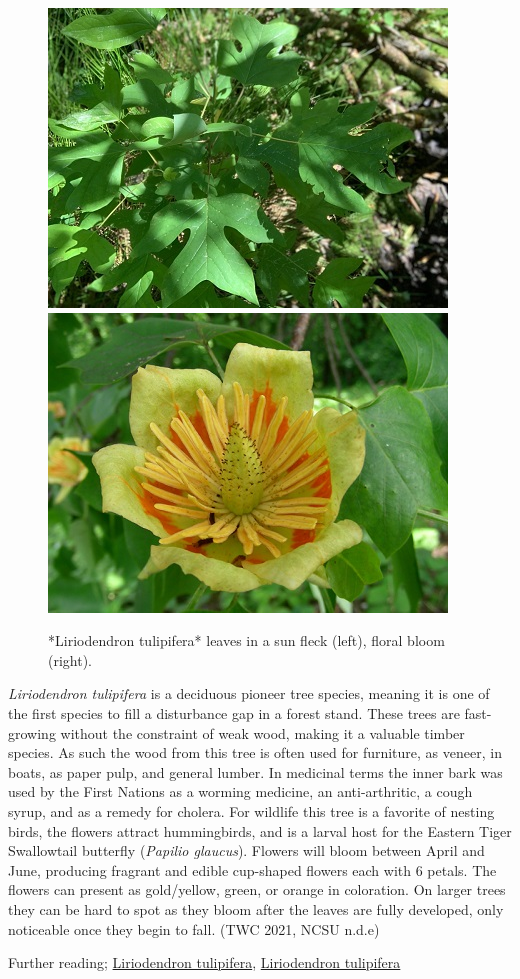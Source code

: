 \documentclass[
]{article}
\begin{document}
\begin{figure}

{\centering \includegraphics[width=0.5\linewidth]{tulip} \includegraphics[width=0.5\linewidth]{tulipflower} 

}

\caption{*Liriodendron tulipifera* leaves in a sun fleck (left), floral bloom (right).}\label{fig:tulippop}
\end{figure}

\emph{Liriodendron tulipifera} is a deciduous pioneer tree species, meaning it is one of the first species to fill a disturbance gap in a forest stand. These trees are fast-growing without the constraint of weak wood, making it a valuable timber species. As such the wood from this tree is often used for furniture, as veneer, in boats, as paper pulp, and general lumber. In medicinal terms the inner bark was used by the First Nations as a worming medicine, an anti-arthritic, a cough syrup, and as a remedy for cholera. For wildlife this tree is a favorite of nesting birds, the flowers attract hummingbirds, and is a larval host for the Eastern Tiger Swallowtail butterfly (\emph{Papilio glaucus}). Flowers will bloom between April and June, producing fragrant and edible cup-shaped flowers each with 6 petals. The flowers can present as gold/yellow, green, or orange in coloration. On larger trees they can be hard to spot as they bloom after the leaves are fully developed, only noticeable once they begin to fall. (TWC 2021, NCSU n.d.e)

Further reading; \href{https://plants.ces.ncsu.edu/plants/liriodendron-tulipifera/}{Liriodendron tulipifera}, \href{https://www.wildflower.org/plants/result.php?id_plant=LITU}{Liriodendron tulipifera}
\end{document}
